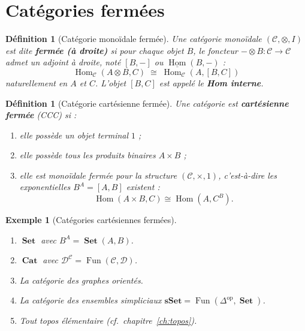 \documentclass[a4paper,12pt]{book}
\DeclareMathOperator{\Hom}{Hom}
\DeclareMathOperator{\Fun}{Fun}
\DeclareMathOperator{\Set}{\mathbf{Set}}
\DeclareMathOperator{\Cat}{\mathbf{Cat}}
\newcommand{\op}{\mathrm{op}}
\newtheorem{definition}[theoreme]{Définition}
\newtheorem{exemple}[theoreme]{Exemple}
\begin{document}
\section{Catégories fermées}\label{sec:categories-fermees}

\begin{definition}[Catégorie monoïdale fermée]\label{def:monoidale-fermee}
Une catégorie monoïdale $(\mathcal{C}, \otimes, I)$ est dite
\textbf{fermée (à droite)} si pour chaque objet $B$,
le foncteur $- \otimes B \colon \mathcal{C} \to \mathcal{C}$
admet un adjoint à droite, noté $[B, -]$ ou $\underline{\Hom}(B, -)$ :
\[
  \Hom_\mathcal{C}(A \otimes B, C)
  \;\cong\;
  \Hom_\mathcal{C}(A, [B, C])
\]
naturellement en $A$ et $C$.
L'objet $[B, C]$ est appelé le \textbf{Hom interne}.
\end{definition}

\begin{definition}[Catégorie cartésienne fermée]\label{def:cartesienne-fermee}
Une catégorie est \textbf{cartésienne fermée} (CCC) si :
\begin{enumerate}[label=(\roman*)]
\item elle possède un objet terminal $1$ ;
\item elle possède tous les produits binaires $A \times B$ ;
\item elle est monoïdale fermée pour la structure
      $(\mathcal{C}, \times, 1)$, c'est-à-dire les exponentielles
      $B^A = [A, B]$ existent :
      \[
        \Hom(A \times B, C) \cong \Hom(A, C^B).
      \]
\end{enumerate}
\end{definition}

\begin{exemple}[Catégories cartésiennes fermées]\label{ex:ccc}
\begin{enumerate}[label=(\roman*)]
\item $\Set$ avec $B^A = \Set(A, B)$.
\item $\Cat$ avec $\mathcal{D}^\mathcal{C} = \Fun(\mathcal{C}, \mathcal{D})$.
\item La catégorie des graphes orientés.
\item La catégorie des ensembles simpliciaux
      $\mathbf{sSet} = \Fun(\Delta^\op, \Set)$.
\item Tout topos élémentaire (cf.\ chapitre~\ref{ch:topos}).
\end{enumerate}
\end{exemple}
\end{document}
